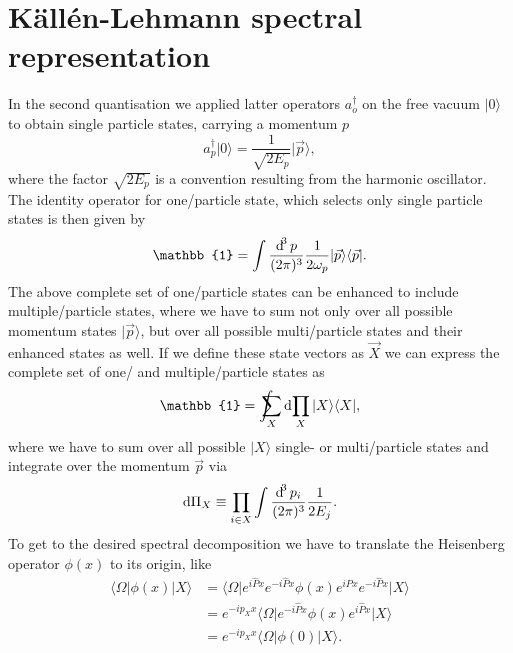 \documentclass[../../index.tex]{subfiles}
\begin{document}
  \chapter{Källén-Lehmann spectral representation}
  \label{ch:kallenLehmannSpectralRepresentation}
In the second quantisation we applied latter operators $a_o^\dagger$ on the free
vacuum $\vert 0 \rangle$ to obtain single particle states, carrying a momentum
$p$
\begin{equation}
  a_p^\dagger \vert 0 \rangle = \frac{1}{\sqrt{2 E_p}}\vert \vec p \rangle,
\end{equation}
where the factor $\sqrt{2 E_p}$ is a convention resulting from the harmonic
oscillator. The identity operator for one\-/particle state, which selects only
single particle states is then given by
\begin{equation}
  \mathbb{1} = \int \frac{\dif^3 p}{(2\pi)^3} \frac{1}{2\omega_p} \vert \vec p \rangle \langle \vec p \vert.
\end{equation}
The above complete set of one\-/particle states can be enhanced to include
multiple\-/particle states, where we have to sum not only over all possible
momentum states $\vert \vec p \rangle$, but over all possible multi\-/particle
states and their enhanced states as well. If we define these state vectors as
$\vec X$ we can express the complete set of one\-/ and multiple\-/particle
states as
\begin{equation}
  \mathbb{1} = \intsum_{X} \dif \prod_X \vert X \rangle \langle  X \vert,
\end{equation}
where we have to sum over all possible $\vert X \rangle$ single- or
multi\-/particle states and integrate over the momentum $\vec p$ via
\begin{equation}
  \dif \Pi_X \equiv \prod_{i \in X} \int \frac{\dif^3 p_i}{(2\pi)^3} \frac{1}{2 E_j}.
\end{equation}
To get to the desired spectral decomposition we have to translate the Heisenberg
operator $\phi(x)$ to its origin, like
\begin{equation}
  \begin{split}
    \langle \Omega \vert \phi(x) \vert X \rangle
    &=  \langle \Omega \vert e^{i \hat P x}e^{-i \hat P x} \phi(x) e^{i \hat P x}e^{-i \hat P x} \vert X \rangle \\
    &= e^{-i p_X x} \langle \Omega \vert e^{-i \hat P x} \phi(x) e^{i \hat P x} \vert X \rangle \\
    &= e^{-i p_X x} \langle \Omega \vert \phi(0) \vert X \rangle.
  \end{split}
\end{equation}
\end{document}
